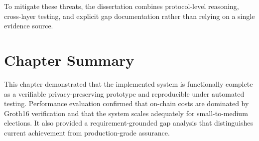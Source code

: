 To mitigate these threats, the dissertation combines protocol-level reasoning, cross-layer testing, and explicit gap documentation rather than relying on a single evidence source.

\section{Chapter Summary}

This chapter demonstrated that the implemented system is functionally complete as a verifiable privacy-preserving prototype and reproducible under automated testing. Performance evaluation confirmed that on-chain costs are dominated by Groth16 verification and that the system scales adequately for small-to-medium elections. It also provided a requirement-grounded gap analysis that distinguishes current achievement from production-grade assurance.

\endgroup

